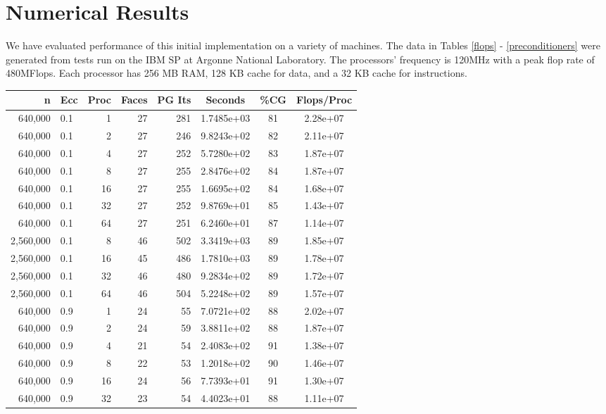 \section{Numerical Results}

We have evaluated performance of this initial implementation
on a variety of machines.  The data
in Tables \ref{flops} - \ref{preconditioners}
were generated from tests run on the IBM SP at Argonne National
Laboratory.  The processors' frequency is 120MHz with a peak
flop rate of 480MFlops.  Each processor has 256 MB RAM, 128 KB cache
for data, and a 32 KB cache for instructions.

\begin{table}[htbp]
\begin{center}
\begin{tabular}{|rlr|rrccc|}
\hline
 n & Ecc & Proc & Faces & PG Its & Seconds  & \%CG & Flops/Proc \\
\hline
640,000 & 0.1 & 1 & 27 & 281 &1.7485e+03 & 81 & 2.28e+07 \\
640,000 & 0.1 & 2 & 27 & 246 & 9.8243e+02 & 82 & 2.11e+07 \\
640,000 & 0.1 & 4 & 27 & 252 & 5.7280e+02 & 83 & 1.87e+07 \\
640,000 & 0.1 & 8 & 27 & 255 & 2.8476e+02 & 84 & 1.87e+07 \\
640,000 & 0.1 & 16 & 27 & 255 & 1.6695e+02 & 84 & 1.68e+07 \\
640,000 & 0.1 & 32 & 27 & 252 & 9.8769e+01 & 85 & 1.43e+07 \\
640,000 & 0.1 & 64 & 27 & 251 & 6.2460e+01 & 87 & 1.14e+07 \\
2,560,000  & 0.1 & 8  & 46 & 502 & 3.3419e+03 & 89 & 1.85e+07  \\
2,560,000  & 0.1 & 16 & 45 & 486 & 1.7810e+03 & 89 & 1.78e+07 \\
2,560,000  & 0.1 & 32 & 46 & 480 & 9.2834e+02  & 89 & 1.72e+07 \\
2,560,000  & 0.1 & 64 & 46 & 504 & 5.2248e+02 & 89 & 1.57e+07 \\
\hline
640,000 & 0.9 & 1 & 24 & 55 & 7.0721e+02  & 88 & 2.02e+07 \\
640,000 & 0.9 & 2 & 24 & 59 & 3.8811e+02 & 88 & 1.87e+07 \\
640,000 & 0.9 & 4 & 21 & 54 & 2.4083e+02 & 91 & 1.38e+07 \\
640,000 & 0.9 &  8 & 22 & 53& 1.2018e+02 & 90 & 1.46e+07 \\
640,000 & 0.9 & 16 & 24 & 56 & 7.7393e+01 & 91 & 1.30e+07 \\
640,000 & 0.9 & 32 & 23 & 54 & 4.4023e+01 & 88 & 1.11e+07 \\

\end{tabular}
\end{center}
\end{table}
